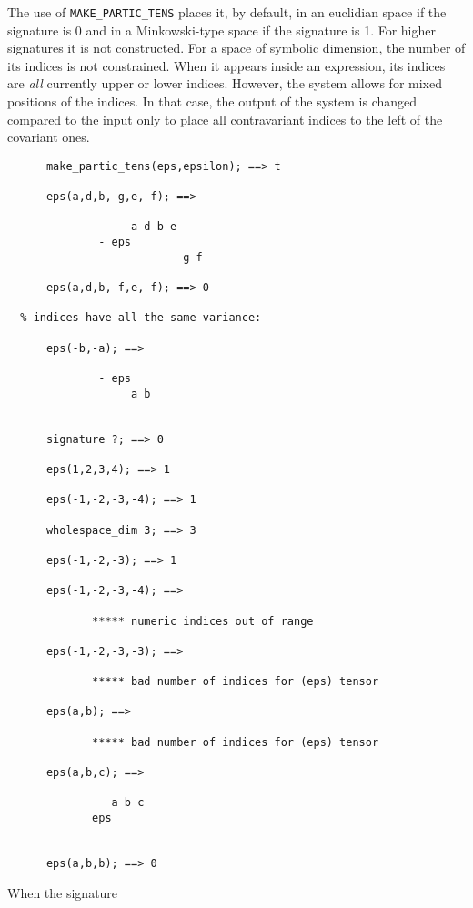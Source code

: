 The use of \texttt{MAKE\_PARTIC\_TENS} places it, by default, in an
euclidian space if the signature is 0 and in a Minkowski-type space if 
the signature%
 is 1. 
For higher signatures it is not constructed.
For a space of symbolic dimension, the number of its indices is not 
constrained. When it appears inside an expression, its indices are \emph{all}
currently upper or lower indices. However, the system allows for 
mixed positions of the indices. In that case, the output of the system 
is changed compared to the input  only to place all contravariant indices
to the left of the covariant ones.
\begin{verbatim}
      make_partic_tens(eps,epsilon); ==> t
 
      eps(a,d,b,-g,e,-f); ==>

                   a d b e
              - eps
                           g f

      eps(a,d,b,-f,e,-f); ==> 0

  % indices have all the same variance:
 
      eps(-b,-a); ==>

              - eps
                   a b


      signature ?; ==> 0

      eps(1,2,3,4); ==> 1

      eps(-1,-2,-3,-4); ==> 1

      wholespace_dim 3; ==> 3

      eps(-1,-2,-3); ==> 1

      eps(-1,-2,-3,-4); ==> 
           
             ***** numeric indices out of range

      eps(-1,-2,-3,-3); ==> 

             ***** bad number of indices for (eps) tensor

      eps(a,b); ==> 

             ***** bad number of indices for (eps) tensor

      eps(a,b,c); ==> 

                a b c
             eps

   
      eps(a,b,b); ==> 0

\end{verbatim}
When the signature%
